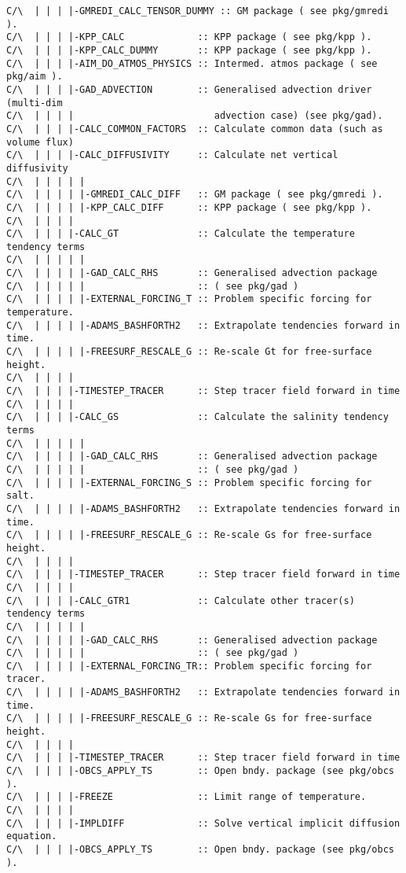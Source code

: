 \begin{verbatim}
C/\  | | | |-GMREDI_CALC_TENSOR_DUMMY :: GM package ( see pkg/gmredi ). 
C/\  | | | |-KPP_CALC             :: KPP package ( see pkg/kpp ).
C/\  | | | |-KPP_CALC_DUMMY       :: KPP package ( see pkg/kpp ).
C/\  | | | |-AIM_DO_ATMOS_PHYSICS :: Intermed. atmos package ( see pkg/aim ).
C/\  | | | |-GAD_ADVECTION        :: Generalised advection driver (multi-dim
C/\  | | | |                         advection case) (see pkg/gad).
C/\  | | | |-CALC_COMMON_FACTORS  :: Calculate common data (such as volume flux)
C/\  | | | |-CALC_DIFFUSIVITY     :: Calculate net vertical diffusivity
C/\  | | | | |
C/\  | | | | |-GMREDI_CALC_DIFF   :: GM package ( see pkg/gmredi ).
C/\  | | | | |-KPP_CALC_DIFF      :: KPP package ( see pkg/kpp ).
C/\  | | | |
C/\  | | | |-CALC_GT              :: Calculate the temperature tendency terms
C/\  | | | | |
C/\  | | | | |-GAD_CALC_RHS       :: Generalised advection package 
C/\  | | | | |                    :: ( see pkg/gad )
C/\  | | | | |-EXTERNAL_FORCING_T :: Problem specific forcing for temperature.
C/\  | | | | |-ADAMS_BASHFORTH2   :: Extrapolate tendencies forward in time.
C/\  | | | | |-FREESURF_RESCALE_G :: Re-scale Gt for free-surface height.
C/\  | | | |
C/\  | | | |-TIMESTEP_TRACER      :: Step tracer field forward in time
C/\  | | | |
C/\  | | | |-CALC_GS              :: Calculate the salinity tendency terms
C/\  | | | | |
C/\  | | | | |-GAD_CALC_RHS       :: Generalised advection package 
C/\  | | | | |                    :: ( see pkg/gad )
C/\  | | | | |-EXTERNAL_FORCING_S :: Problem specific forcing for salt.
C/\  | | | | |-ADAMS_BASHFORTH2   :: Extrapolate tendencies forward in time.
C/\  | | | | |-FREESURF_RESCALE_G :: Re-scale Gs for free-surface height.
C/\  | | | |
C/\  | | | |-TIMESTEP_TRACER      :: Step tracer field forward in time
C/\  | | | |
C/\  | | | |-CALC_GTR1            :: Calculate other tracer(s) tendency terms
C/\  | | | | |
C/\  | | | | |-GAD_CALC_RHS       :: Generalised advection package 
C/\  | | | | |                    :: ( see pkg/gad )
C/\  | | | | |-EXTERNAL_FORCING_TR:: Problem specific forcing for tracer.
C/\  | | | | |-ADAMS_BASHFORTH2   :: Extrapolate tendencies forward in time.
C/\  | | | | |-FREESURF_RESCALE_G :: Re-scale Gs for free-surface height.
C/\  | | | |
C/\  | | | |-TIMESTEP_TRACER      :: Step tracer field forward in time
C/\  | | | |-OBCS_APPLY_TS        :: Open bndy. package (see pkg/obcs ).
C/\  | | | |-FREEZE               :: Limit range of temperature.
C/\  | | | |
C/\  | | | |-IMPLDIFF             :: Solve vertical implicit diffusion equation.
C/\  | | | |-OBCS_APPLY_TS        :: Open bndy. package (see pkg/obcs ). 

\end{verbatim}
